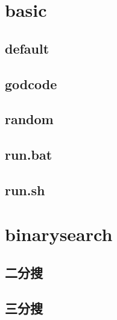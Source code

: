 \documentclass[a4paper,10pt,twocolumn,oneside]{article}
\begin{document}
\pagestyle{fancy}
\fancyfoot{}
\fancyhead[R]{\thepage}
\renewcommand{\headrulewidth}{0.4pt}
\renewcommand{\contentsname}{Contents} 

\newcommand{\includetex}[2]{
  \subsection{#1}
  
  \vspace{-1.2em}
}
\scriptsize
\tableofcontents

\section{basic}
    \subsection{default}
    

    \subsection{godcode}
    

    \subsection{random}
    

    \subsection{run.bat}
    

    \subsection{run.sh}
    

\section{binarysearch}
    \subsection{二分搜}
    

    \subsection{三分搜}
    
\end{document}
